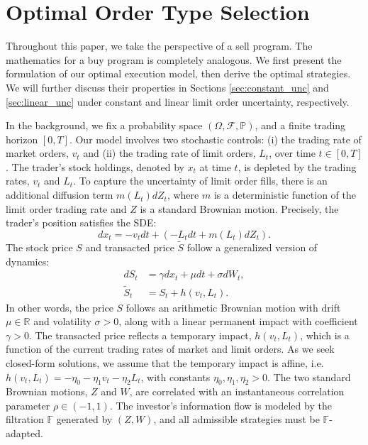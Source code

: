 \documentclass[12pt, letterpaper]{article}
\def\R{{\mathbb R}}        %
\numberwithin{equation}{section}
\numberwithin{theorem}{section}
\begin{document}
\section{Optimal Order Type Selection}\label{sec:model_order_fills} 
Throughout this paper, we take the perspective of a sell program. The mathematics for a buy program is completely analogous. We first present the formulation of our optimal execution model, then derive the optimal strategies. We will further discuss their properties in Sections \ref{sec:constant_unc} and \ref{sec:linear_unc} under constant and linear limit order uncertainty, respectively.  

 In the background, we fix a probability space $(\Omega, \mathcal{F},  \mathbb{P})$, and a finite trading horizon $[0,T]$. Our model involves two stochastic  controls: (i) the trading rate of market orders, $v_t$ and (ii)  the trading rate of limit orders, $L_t$, over time $t\in [0,T]$. The trader's stock holdings, denoted by $x_t$ at time $t$, is depleted by the trading rates, $v_t$ and $L_t$. To capture the uncertainty of limit order fills, there is an additional diffusion term $m(L_t)dZ_t$, where $m$ is a deterministic function of the limit order trading rate and $Z$ is a standard Brownian motion.   Precisely, the trader's position satisfies the SDE:
\begin{equation}\label{eq:SDEx}
dx_t=-v_t dt+\left(-L_t dt+m(L_t)dZ_t\right).
\end{equation}
The stock price $S$ and transacted price $\widetilde{S}$ follow a generalized version of \cite{AC2000} dynamics: 
\begin{equation}\label{eq:S_price}
\begin{aligned}
dS_t&=\gamma dx_t +\mu dt +\sigma dW_t,\\
\widetilde{S}_t&=S_t+h(v_t,L_t).
\end{aligned}
\end{equation}
In other words, the price $S$ follows an arithmetic Brownian motion with drift $\mu\in \R$ and volatility $\sigma>0$, along with a linear permanent impact with coefficient $\gamma>0$. The transacted price reflects a temporary impact, $h(v_t,L_t)$, which is a function of the current trading rates of market and limit orders. As we seek closed-form solutions, we assume that the temporary impact is affine, i.e. $h(v_t,L_t)=-\eta_0-\eta_1 v_t-\eta_2 L_t$, with constants $\eta_0,\eta_1,\eta_2>0$. The two standard Brownian motions, $Z$ and $W$, are correlated with an instantaneous correlation parameter $\rho\in(-1,1)$. The investor's information flow is modeled by the filtration $\mathbb{F}$ generated by $(Z,W)$, and all admissible strategies must be  $\mathbb{F}$-adapted.
\end{document}
